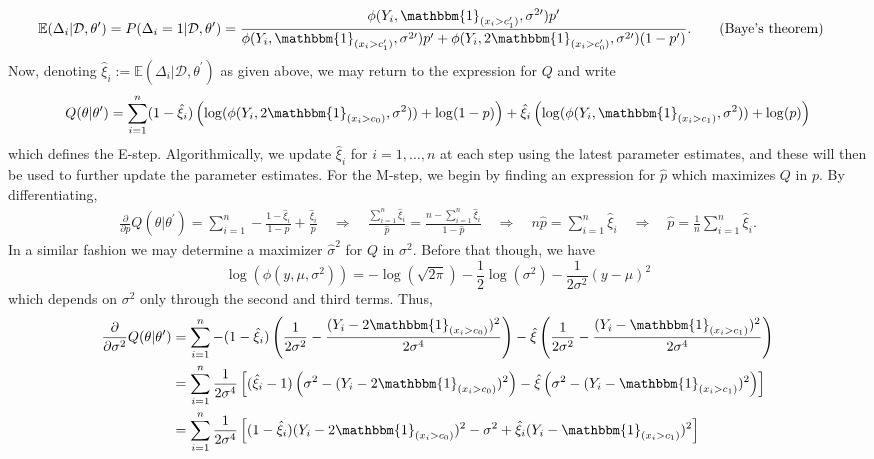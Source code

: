 \documentclass[10pt]{article}
\newcommand{\E}{\mathbb{E}}
\newcommand{\bp}[1]{\left({#1}\right)}
\newcommand{\1}[1]{\mathbbm{1}_{#1}}
\newcommand{\mc}[1]{\mathcal{#1}}
\begin{document}
\begin{align*}
    \E(\Delta_i|\mc{D},\theta^\prime)&=P(\Delta_i=1|\mc{D},\theta^\prime)=\frac{\phi(Y_i,\mathbbm{1}_{(x_i>c_1^\prime)},\sigma^{2\prime})p^\prime}{\phi(Y_i,\mathbbm{1}_{(x_i>c_1^\prime)},\sigma^{2\prime})p^\prime + \phi(Y_i,2\mathbbm{1}_{(x_i>c_0^\prime)},\sigma^{2\prime})(1-p^\prime)}.\tag{Baye's theorem}
\end{align*}
Now, denoting $\hat{\xi}_i:=\E(\Delta_i|\mc{D},\theta^\prime)$ as given above, we may return to the expression for $Q$ and write
\begin{align*}
    Q(\theta|\theta^\prime)=\sum_{i=1}^n(1-\hat{\xi}_i)\bp{\log(\phi(Y_i,2\mathbbm{1}_{(x_i>c_0)},\sigma^2))+\log(1-p)}+\hat{\xi}_i\bp{\log(\phi(Y_i,\mathbbm{1}_{(x_i>c_1)},\sigma^2))+\log(p)}
\end{align*}
which defines the E-step. Algorithmically, we update $\hat{\xi}_i$ for $i=1,\dots,n$ at each step using the latest parameter estimates, and these will then be used to further update the parameter estimates. For the M-step, we begin by finding an expression for $\hat{p}$ which maximizes $Q$ in $p$. By differentiating,
\begin{align*}
    \frac{\partial}{\partial p}Q(\theta|\theta^\prime)=\sum_{i=1}^n-\frac{1-\hat{\xi}_i}{1-p}+\frac{\hat{\xi}_i}{p}\quad\Rightarrow\quad\frac{\sum_{i=1}^n\hat{\xi}_i}{\hat{p}}=\frac{n-\sum_{i=1}^n\hat{\xi}_i}{1-\hat{p}}\quad\Rightarrow\quad n\hat{p}=\sum_{i=1}^n\hat{\xi}_i\quad\Rightarrow\quad \hat{p}=\frac{1}{n}\sum_{i=1}^n\hat{\xi}_i.
\end{align*} 
In a similar fashion we may determine a maximizer $\hat{\sigma}^2$ for $Q$ in $\sigma^2$. Before that though, we have 
\[\log(\phi(y,\mu,\sigma^2))=-\log(\sqrt{2\pi})-\frac{1}{2}\log(\sigma^2)-\frac{1}{2\sigma^2}(y-\mu)^2\]
which depends on $\sigma^2$ only through the second and third terms. Thus,
\begin{align*}
    \frac{\partial}{\partial\sigma^2}Q(\theta|\theta^\prime)&=\sum_{i=1}^n-(1-\hat{\xi}_i)\bp{\frac{1}{2\sigma^2}-\frac{(Y_i-2\mathbbm{1}_{(x_i>c_0)})^2}{2\sigma^4}}-\hat{\xi}\bp{\frac{1}{2\sigma^2}-\frac{(Y_i-\mathbbm{1}_{(x_i>c_1)})^2}{2\sigma^4}}\\
    &=\sum_{i=1}^n\frac{1}{2\sigma^4}\left[(\hat{\xi}_i-1)\bp{\sigma^2-(Y_i-2\mathbbm{1}_{(x_i>c_0)})^2}-\hat{\xi}\bp{\sigma^2-(Y_i-\mathbbm{1}_{(x_i>c_1)})^2}\right]\\
    &=\sum_{i=1}^n\frac{1}{2\sigma^4}\left[(1-\hat{\xi}_i)(Y_i-2\mathbbm{1}_{(x_i>c_0)})^2-\sigma^2+\hat{\xi}_i(Y_i-\mathbbm{1}_{(x_i>c_1)})^2\right]
\end{align*}
\end{document}
